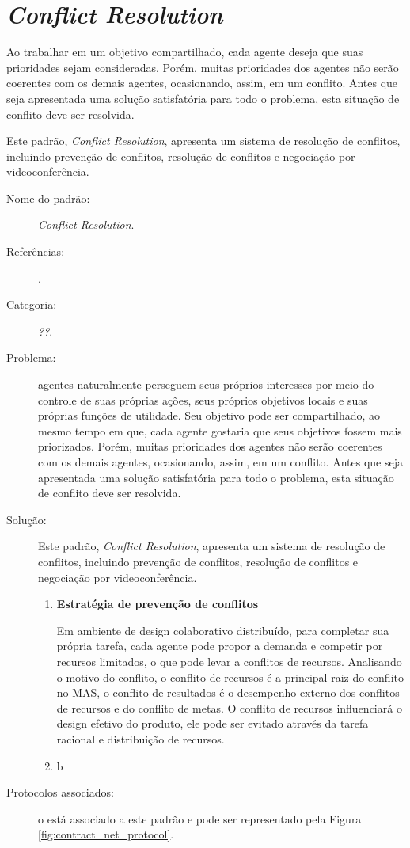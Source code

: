 \section{\textit{Conflict Resolution}}

Ao trabalhar em um objetivo compartilhado, cada agente deseja que suas prioridades sejam consideradas. Porém, muitas prioridades dos agentes não serão coerentes com os demais agentes, ocasionando, assim, em um conflito. Antes que seja apresentada uma solução satisfatória para todo o problema, esta situação de conflito deve ser resolvida.

Este padrão, \textit{Conflict Resolution}, apresenta um sistema de resolução de conflitos, incluindo prevenção de conflitos, resolução de conflitos e negociação por videoconferência.


\begin{description}
  \item[Nome do padrão:] \textit{Conflict Resolution}.
    \item[Referências:]    .
    \item[Categoria:] \textit{??}.
    \item[Problema:] agentes naturalmente perseguem seus próprios interesses por meio do controle de suas próprias ações, seus próprios objetivos locais e suas próprias funções de utilidade.
    Seu objetivo pode ser compartilhado, ao mesmo tempo em que, cada agente gostaria que seus objetivos fossem mais priorizados. Porém, muitas prioridades dos agentes não serão coerentes com os demais agentes, ocasionando, assim, em um conflito. Antes que seja apresentada uma solução satisfatória para todo o problema, esta situação de conflito deve ser resolvida.
    
    \item[Solução:] Este padrão, \textit{Conflict Resolution}, apresenta um sistema de resolução de conflitos, incluindo prevenção de conflitos, resolução de conflitos e negociação por videoconferência.
    \begin{enumerate} 
    \item \textbf{Estratégia de prevenção de conflitos}
    
Em ambiente de design colaborativo distribuído, para completar sua própria tarefa, cada agente pode propor a demanda e competir por recursos limitados, o que pode levar a conflitos de recursos. Analisando o motivo do conflito, o conflito de recursos é a principal raiz do conflito no MAS, o conflito de resultados é o desempenho externo dos conflitos de recursos e do conflito de metas. O conflito de recursos influenciará o design efetivo do produto, ele pode ser evitado através da tarefa racional e distribuição de recursos.
    \item b
    \end{enumerate}
    \item[Protocolos associados:] o \contract está associado a este padrão e pode ser representado pela Figura \ref{fig:contract_net_protocol}.


\end{description}
